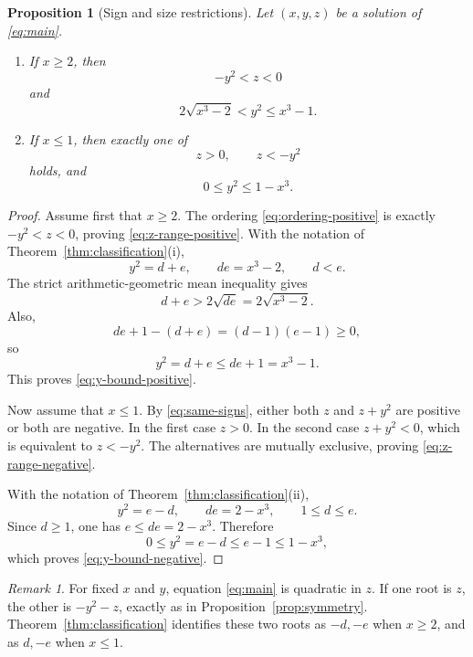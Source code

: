 \documentclass[11pt,a4paper]{amsart}
\newtheorem{proposition}[theorem]{Proposition}
\theoremstyle{remark}
\newtheorem{remark}[theorem]{Remark}
\begin{document}
\begin{proposition}[Sign and size restrictions]\label{prop:size}
Let $(x,y,z)$ be a solution of \eqref{eq:main}.

\begin{enumerate}
\item If $x\geq2$, then
\begin{equation}\label{eq:z-range-positive}
 -y^2<z<0
\end{equation}
and
\begin{equation}\label{eq:y-bound-positive}
 2\sqrt{x^3-2}<y^2\leq x^3-1.
\end{equation}
\item If $x\leq1$, then exactly one of
\begin{equation}\label{eq:z-range-negative}
 z>0,
 \qquad z<-y^2
\end{equation}
holds, and
\begin{equation}\label{eq:y-bound-negative}
 0\leq y^2\leq1-x^3.
\end{equation}
\end{enumerate}
\end{proposition}

\begin{proof}
Assume first that $x\geq2$.  The ordering \eqref{eq:ordering-positive} is exactly $-y^2<z<0$, proving \eqref{eq:z-range-positive}.  With the notation of Theorem~\ref{thm:classification}(i),
\[
 y^2=d+e,
 \qquad de=x^3-2,
 \qquad d<e.
\]
The strict arithmetic-geometric mean inequality gives
\[
 d+e>2\sqrt{de}=2\sqrt{x^3-2}.
\]
Also,
\[
 de+1-(d+e)=(d-1)(e-1)\geq0,
\]
so
\[
 y^2=d+e\leq de+1=x^3-1.
\]
This proves \eqref{eq:y-bound-positive}.

Now assume that $x\leq1$.  By \eqref{eq:same-signs}, either both $z$ and $z+y^2$ are positive or both are negative.  In the first case $z>0$.  In the second case $z+y^2<0$, which is equivalent to $z<-y^2$.  The alternatives are mutually exclusive, proving \eqref{eq:z-range-negative}.

With the notation of Theorem~\ref{thm:classification}(ii),
\[
 y^2=e-d,
 \qquad de=2-x^3,
 \qquad 1\leq d\leq e.
\]
Since $d\geq1$, one has $e\leq de=2-x^3$.  Therefore
\[
 0\leq y^2=e-d\leq e-1\leq1-x^3,
\]
which proves \eqref{eq:y-bound-negative}.
\end{proof}

\begin{remark}\label{rem:quadratic-roots}
For fixed $x$ and $y$, equation \eqref{eq:main} is quadratic in $z$.  If one root is $z$, the other is $-y^2-z$, exactly as in Proposition~\ref{prop:symmetry}.  Theorem~\ref{thm:classification} identifies these two roots as $-d,-e$ when $x\geq2$, and as $d,-e$ when $x\leq1$.
\end{remark}
\end{document}
